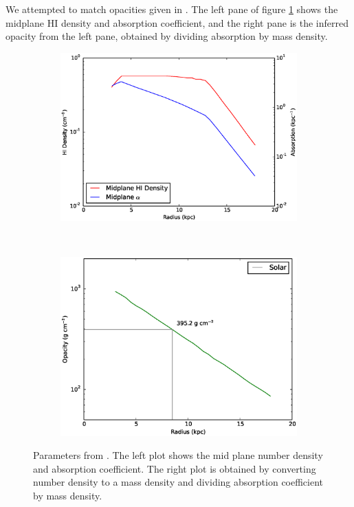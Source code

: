 We attempted to match opacities given in \citet{wolfireEt03}. The left pane of figure \ref{fig:wolfiresummary} shows the midplane HI density and absorption coefficient, and the right pane is the inferred opacity from the left pane, obtained by dividing absorption by mass density.

\begin{figure}
        \centering
        \begin{subfigure}[b]{0.45\textwidth}
                \includegraphics[width=\textwidth]{graphics/densityabsorptionvr.eps}
        \end{subfigure}
        ~ 
        \begin{subfigure}[b]{0.45\textwidth}
                \includegraphics[width=\textwidth]{graphics/opacityvr.eps}
        \end{subfigure}
        \caption[Parameters from \citet{wolfireEt03}.]{Parameters from \citet{wolfireEt03}. The left plot shows the mid plane number density and absorption coefficient. The right plot is obtained by converting number density to a mass density and dividing absorption coefficient by mass density.}
        \label{fig:wolfiresummary}
\end{figure}

